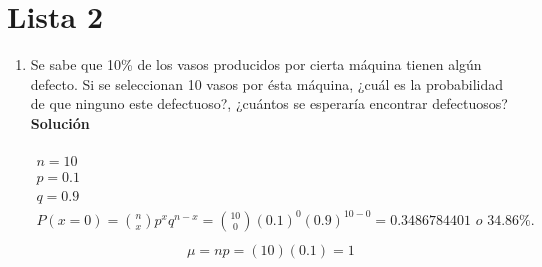 \section{Lista 2}
\begin{enumerate}
	\item Se sabe que 10\% de los vasos producidos por cierta máquina tienen algún defecto. Si se seleccionan 10 vasos por ésta máquina, ¿cuál es la probabilidad de que ninguno este defectuoso?, ¿cuántos se esperaría encontrar defectuosos?
	\\\textbf{Solución}
	\\ \\
	\begin{gather*}
		n = 10 \\
		p = 0.1 \\
		q = 0.9 \\
		P(x = 0) = \binom{n}{x}p^xq^{n-x} = \binom{10}{0}(0.1)^0(0.9)^{10-0} = 0.3486784401 \textit{ o 34.86\%.} \\
	\end{gather*}
	\begin{gather*}
		\mu = np = (10)(0.1) = 1
	\end{gather*}
	

\end{enumerate}
